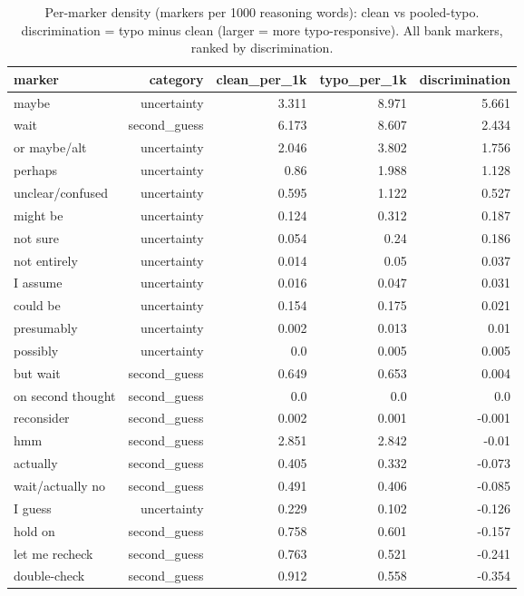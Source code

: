 \documentclass[11pt]{article}
\begin{document}
\begin{table}[H]
\centering
\caption{Per-marker density (markers per 1000 reasoning words): clean vs pooled-typo. discrimination = typo minus clean (larger = more typo-responsive). All bank markers, ranked by discrimination.}
\small
\begin{adjustbox}{max width=\textwidth}
\begin{tabular}{lrrrr}
\toprule
\textbf{marker} & \textbf{category} & \textbf{clean\_per\_1k} & \textbf{typo\_per\_1k} & \textbf{discrimination} \\
\midrule
maybe & uncertainty & 3.311 & 8.971 & 5.661 \\
wait & second\_guess & 6.173 & 8.607 & 2.434 \\
or maybe/alt & uncertainty & 2.046 & 3.802 & 1.756 \\
perhaps & uncertainty & 0.86 & 1.988 & 1.128 \\
unclear/confused & uncertainty & 0.595 & 1.122 & 0.527 \\
might be & uncertainty & 0.124 & 0.312 & 0.187 \\
not sure & uncertainty & 0.054 & 0.24 & 0.186 \\
not entirely & uncertainty & 0.014 & 0.05 & 0.037 \\
I assume & uncertainty & 0.016 & 0.047 & 0.031 \\
could be & uncertainty & 0.154 & 0.175 & 0.021 \\
presumably & uncertainty & 0.002 & 0.013 & 0.01 \\
possibly & uncertainty & 0.0 & 0.005 & 0.005 \\
but wait & second\_guess & 0.649 & 0.653 & 0.004 \\
on second thought & second\_guess & 0.0 & 0.0 & 0.0 \\
reconsider & second\_guess & 0.002 & 0.001 & -0.001 \\
hmm & second\_guess & 2.851 & 2.842 & -0.01 \\
actually & second\_guess & 0.405 & 0.332 & -0.073 \\
wait/actually no & second\_guess & 0.491 & 0.406 & -0.085 \\
I guess & uncertainty & 0.229 & 0.102 & -0.126 \\
hold on & second\_guess & 0.758 & 0.601 & -0.157 \\
let me recheck & second\_guess & 0.763 & 0.521 & -0.241 \\
double-check & second\_guess & 0.912 & 0.558 & -0.354 \\
\bottomrule
\end{tabular}
\end{adjustbox}
\end{table}
\end{document}
